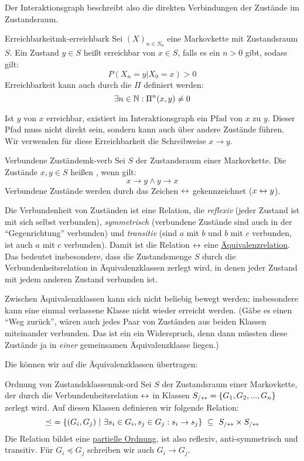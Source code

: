 Der Interaktionsgraph beschreibt also die direkten
Verbindungen der Zustände im Zustandsraum.

\begin{definition}{Erreichbarkeit}{mk-erreichbark}
Sei $(X)_{n\in N_0}$ eine Markovkette mit Zustandsraum $S$. Ein Zustand $y\in S$
heißt erreichbar von $x\in S$, falls es ein $n>0$ gibt, sodass gilt:
\[
P(X_n=y|X_0=x) > 0
\]
Erreichbarkeit kann auch durch die  $\Pi$
definiert werden:
\[
\exists n\in\mathbb{N}: \Pi^n(x,y) \ne 0
\]
\end{definition}

Ist $y$ von $x$ erreichbar, existiert im Interaktionsgraph ein Pfad von $x$ zu
$y$. Dieser Pfad muss nicht direkt sein, sondern kann auch über andere Zustände
führen. Wir verwenden für diese Erreichbarkeit die Schreibweise $x\to y$.

\begin{definition}{Verbundene Zustände}{mk-verb}
Sei $S$ der Zustandsraum einer Markovkette. Die Zustände $x,y\in S$ heißen
, wenn gilt:
\[
x\to y \land y \to x
\]
Verbundene Zustände werden durch das Zeichen $\leftrightarrow$ gekennzeichnet
($x \leftrightarrow y$).
\end{definition}

Die Verbundenheit von Zuständen ist eine Relation, die \emph{reflexiv} (jeder
Zustand ist mit sich selbst verbunden), \emph{symmetrisch} (verbundene
Zustände sind auch in der "`Gegenrichtung"' verbunden) und \emph{transitiv}
(sind $a$ mit $b$ und $b$ mit $c$ verbunden, ist auch $a$ mit $c$
verbunden). Damit ist die Relation $\leftrightarrow$ eine
\href{https://de.wikibooks.org/wiki/Mathe\_f\%C3\%BCr\_Nicht-Freaks:\_\%C3\%d84quivalenzrelation}
{Äquivalenzrelation}.
Das bedeutet insbesondere, dass die Zustandsmenge $S$ durch die Verbundenheitsrelation in
Äquivalenzklassen zerlegt wird, in denen jeder Zustand mit jedem anderen Zustand
verbunden ist.

Zwischen Äquivalenzklassen kann sich nicht beliebig bewegt werden; insbesondere
kann eine einmal verlassene Klasse nicht wieder erreicht werden. (Gäbe es einen
"`Weg zurück"', wären auch jedes Paar von Zuständen aus beiden Klassen
miteinander verbunden. Das ist ein ein Widerspruch, denn dann müssten diese
Zustände ja in \emph{einer} gemeinsamen Äquivalenzklasse liegen.)

Die  können wir auf die
Äquivalenzklassen übertragen:
\begin{definition}{Ordnung von Zustandsklassen}{mk-ord}
Sei $S$ der Zustandsraum einer Markovkette, der durch die Verbundenheitsrelation
$\leftrightarrow$ in Klassen $S_{/\leftrightarrow}=\{G_1, G_2,...,G_n\}$ zerlegt wird. Auf diesen
Klassen definieren wir folgende Relation:
\[
\preceq\ =\{(G_i, G_j)\ |\ \exists s_i\in G_i, s_j\in G_j: s_i\to s_j\}\ \subseteq\ S_{/\leftrightarrow}\times S_{/\leftrightarrow}
\]
Die Relation bildet eine \href{https://de.wikibooks.org/wiki/Mathe\_f\%C3\%BCr\_Nicht-Freaks:\_Ordnungsrelation#Halbordnung}
{partielle Ordnung}, ist also reflexiv, anti-symmetrisch und transitiv. Für
$G_i\preceq G_j$ schreiben wir auch $G_i\to G_j$.
\end{definition}

